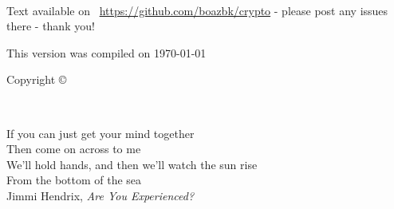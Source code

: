 \frontmatter


\maketitle



\newpage
\begin{fullwidth}
~\vfill
\thispagestyle{empty}
\setlength{\parindent}{0pt}
\setlength{\parskip}{\baselineskip}

Text available on \faGithub\  \url{https://github.com/boazbk/crypto} - please post any issues there - thank you!

This version was compiled on \today\ \currenttime

Copyright \copyright\ \the\year\ \thanklessauthor

\doclicenseThis



\end{fullwidth}



\cleardoublepage
\thispagestyle{empty}%
~\vfill
\begin{doublespace}
\nohyphenation
\noindent If you can just get your mind together \\
\noindent  Then come on across to me \\
\noindent We'll hold hands, and then we'll watch the sun rise \\
\noindent  From the bottom of the sea \\

Jimmi Hendrix, \emph{Are You Experienced?}
\end{doublespace}
\vfill
\vfill








\cleardoublepage

\setcounter{tocdepth}{1}
\setcounter{secnumdepth}{3}


\cleardoublepage
\setcounter{tocdepth}{3}
\tableofcontents


\cleardoublepage
